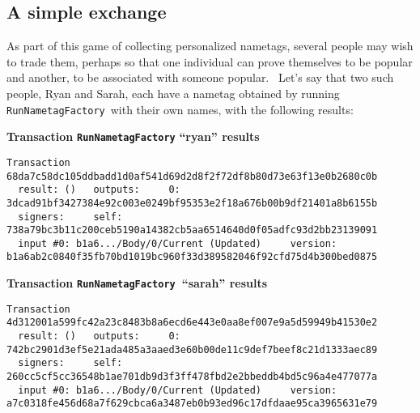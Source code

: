 \documentclass[11pt]{article}
\newcommand{\codeblock}[1]{\begin{mdframed}[
    backgroundcolor=header-color,
    linecolor=header-color,
    innertopmargin=10pt,
    ]{\texttt{#1}}\end{mdframed}}
\begin{document}
\subsection{A simple exchange}
\vspace{5.5pt}

As part of this game of collecting personalized nametags, several people may wish to trade them, perhaps so that one individual can prove themselves to be popular and another, to be associated with someone popular.  Let's say that two such people, Ryan and Sarah, each have a nametag obtained by running \texttt{RunNametagFactory} with their own names, with the following results:


\vspace{11pt}
\textbf{Transaction }\textbf{\texttt{RunNametagFactory}}\textbf{ “ryan” results}

\codeblock{Transaction 68da7c58dc105ddbadd1d0af541d69d2d8f2f72df8b80d73e63f13e0b2680c0b\newline
  result: ()\newline
  outputs:\newline
    0: 3dcad91bf3427384e92c003e0249bf95353e2f18a676b00b9df21401a8b6155b\newline
  signers:\newline
    self: 738a79bc3b11c200ceb5190a14382cb5aa6514640d0f05adfc93d2bb23139091\newline
  input \#0: b1a6...\slash{}Body\slash{}0\slash{}Current (Updated)\newline
    version: b1a6ab2c0840f35fb70bd1019bc960f33d389582046f92cfd75d4b300bed0875}

\textbf{Transaction }\textbf{\texttt{RunNametagFactory}}\textbf{ “sarah” results}

\codeblock{Transaction 4d312001a599fc42a23c8483b8a6ecd6e443e0aa8ef007e9a5d59949b41530e2\newline
  result: ()\newline
  outputs:\newline
    0: 742bc2901d3ef5e21ada485a3aaed3e60b00de11c9def7beef8c21d1333aec89\newline
  signers:\newline
    self: 260cc5cf5cc36548b1ae701db9d3f3ff478fbd2e2bbeddb4bd5c96a4e477077a\newline
  input \#0: b1a6...\slash{}Body\slash{}0\slash{}Current (Updated)\newline
    version: a7c0318fe456d68a7f629cbca6a3487eb0b93ed96c17dfdaae95ca3965631e79}
\end{document}
